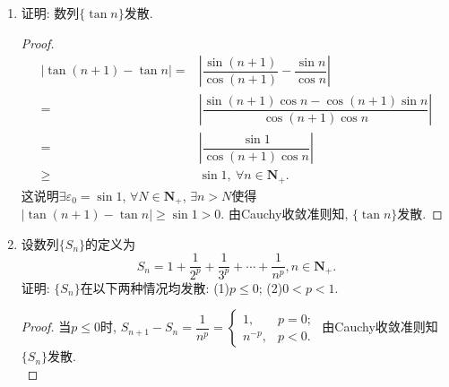 \documentclass[a4paper,11pt,twoside]{ctexbook}
\begin{document}
\begin{enumerate}
\begin{proof}
		      假设已经找出了$x_{n_k}$, 使得$x_{n_k}>x_{n_{k-1}}$, $x_{n_{k}}>M_k=k$, 则对于$M_{k+1}=k+1$, $\exists n_{k+1}\in\mathbf{N}_{+}, n_{k+1}>n_{k}$, 使得$x_{n_{k+1}}>k+1$, 断言这样的$n_{k+1}$是可以找到的, 否则$\forall n>n_k$, $x_n\leqslant M_{k+1}$, 与$\{x_n\}$无界矛盾. 由数学归纳法可知找出了数列$\{x_{n_{k}}\}$使得$n_1<n_2<\cdots<n_k<n_{k+1}<\cdots$, $x_{n_k}>k, k\in\mathbf{N}_{+}$. 这说明$\{x_{n_k}\}$是$\{x_n\}$的子列, 并且$\{x_{n_k}\}$是正的无穷大量. 同理若$\{x_n\}$无下界时可找到一个子列是负的无穷大量.\qedhere
	      \end{proof}
	\item 证明: 数列$\{\tan{n}\}$发散.
	      \begin{proof}
		      \begin{equation*}
			      \begin{split}
				      |\tan(n+1)-\tan{n}|=&\left|\dfrac{\sin(n+1)}{\cos(n+1)}-\dfrac{\sin{n}}{\cos{n}}\right|\\
				      =&\left|\dfrac{\sin(n+1)\cos{n}-\cos(n+1)\sin{n}}{\cos(n+1)\cos{n}}\right|\\
				      =&\left|\dfrac{\sin{1}}{\cos(n+1)\cos{n}}\right|\\
				      \geqslant&\sin{1},\ \forall n\in\mathbf{N}_{+}.
			      \end{split}
		      \end{equation*}
		      这说明$\exists\varepsilon_0=\sin{1}$, $\forall N\in\mathbf{N}_{+}$, $\exists n>N$使得$|\tan(n+1)-\tan{n}|\geqslant\sin{1}>0$. 由Cauchy收敛准则知, $\{\tan{n}\}$发散.\qedhere
	      \end{proof}
	\item 设数列$\{S_n\}$的定义为
	      \[
		      S_n=1+\dfrac{1}{2^p}+\dfrac{1}{3^p}+\cdots+\dfrac{1}{n^p}, n\in\mathbf{N}_{+}.
	      \]
	      证明: $\{S_n\}$在以下两种情况均发散: (1)$p\leqslant 0$; (2)$0<p<1$.
	      \begin{proof}
		      当$p\leqslant 0$时, $S_{n+1}-S_n=\dfrac{1}{n^p}=\begin{cases}1, & p=0;\\ n^{-p}, & p<0.\end{cases}$ 由Cauchy收敛准则知$\{S_n\}$发散.\\


\end{proof}
\end{enumerate}
\end{document}
